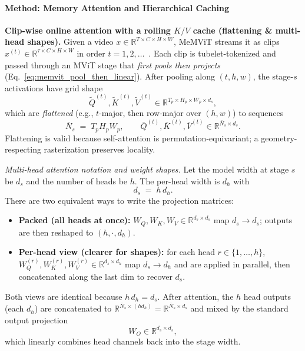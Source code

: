 \begin{enrichment}
\begin{enrichment}
        \paragraph{Method: Memory Attention and Hierarchical Caching}
        \label{subsubsec:chapter24_memvit_method}
        
        \textbf{Clip-wise online attention with a rolling $K/V$ cache (flattening \& multi-head shapes).}
        Given a video $x\!\in\!\mathbb{R}^{T\times C\times H\times W}$, MeMViT streams it as clips $x^{(t)}\!\in\!\mathbb{R}^{\tau\times C\times H\times W}$ in order $t{=}1,2,\dots$~\cite[Sec.~4.1]{wu2022_memvit}. Each clip is tubelet-tokenized and passed through an MViT stage that \emph{first pools then projects} (Eq.~\eqref{eq:memvit_pool_then_linear}). After pooling along $(t,h,w)$, the stage-$s$ activations have grid shape
        \[
        \tilde Q^{(t)},\tilde K^{(t)},\tilde V^{(t)}\in\mathbb{R}^{T_p\times H_p\times W_p\times d_s},
        \]
        which are \emph{flattened} (e.g., $t$-major, then row-major over $(h,w)$) to sequences
        \[
        \bar N_s \;=\; T_pH_pW_p,\qquad
        \bar Q^{(t)},\bar K^{(t)},\bar V^{(t)}\in\mathbb{R}^{\bar N_s\times d_s}.
        \]
        Flattening is valid because self-attention is permutation-equivariant; a geometry-respecting rasterization preserves locality.
        
        \emph{Multi-head attention notation and weight shapes.} Let the model width at stage $s$ be $d_s$ and the number of heads be $h$. The per-head width is $d_h$ with
        \[
        d_s \;=\; h\,d_h.
        \]
        There are two equivalent ways to write the projection matrices:
        \begin{itemize}
            \item \textbf{Packed (all heads at once):} $W_Q,W_K,W_V\in\mathbb{R}^{d_s\times d_s}$ map $d_s\!\to\!d_s$; outputs are then reshaped to $(h,\cdot,d_h)$.
            \item \textbf{Per-head view (clearer for shapes):} for each head $r\!\in\!\{1,\dots,h\}$, $W_Q^{(r)},W_K^{(r)},W_V^{(r)}\in\mathbb{R}^{d_s\times d_h}$ map $d_s\!\to\!d_h$ and are applied in parallel, then concatenated along the last dim to recover $d_s$.
        \end{itemize}
        Both views are identical because $h\,d_h\!=\!d_s$. After attention, the $h$ head outputs (each $d_h$) are concatenated to $\mathbb{R}^{\bar N_s\times (h d_h)}{=}\mathbb{R}^{\bar N_s\times d_s}$ and mixed by the standard output projection
        \[
        W_O \in \mathbb{R}^{d_s\times d_s},
        \]
        which linearly combines head channels back into the stage width.
        

\end{enrichment}
\end{enrichment}

